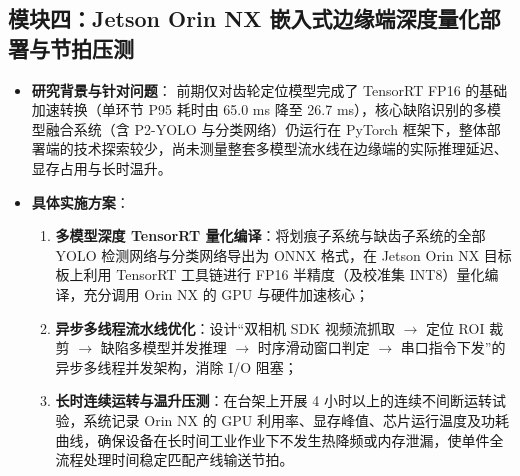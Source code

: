 \subsection*{模块四：Jetson Orin NX 嵌入式边缘端深度量化部署与节拍压测}
\begin{itemize}
    \item \textbf{研究背景与针对问题}：
    前期仅对齿轮定位模型完成了 TensorRT FP16 的基础加速转换（单环节 P95 耗时由 65.0 ms 降至 26.7 ms），核心缺陷识别的多模型融合系统（含 P2-YOLO 与分类网络）仍运行在 PyTorch 框架下，整体部署端的技术探索较少，尚未测量整套多模型流水线在边缘端的实际推理延迟、显存占用与长时温升。
    \item \textbf{具体实施方案}：
    \begin{enumerate}
        \item \textbf{多模型深度 TensorRT 量化编译}：将划痕子系统与缺齿子系统的全部 YOLO 检测网络与分类网络导出为 ONNX 格式，在 Jetson Orin NX 目标板上利用 TensorRT 工具链进行 FP16 半精度（及校准集 INT8）量化编译，充分调用 Orin NX 的 GPU 与硬件加速核心；
        \item \textbf{异步多线程流水线优化}：设计“双相机 SDK 视频流抓取 $\rightarrow$ 定位 ROI 裁剪 $\rightarrow$ 缺陷多模型并发推理 $\rightarrow$ 时序滑动窗口判定 $\rightarrow$ 串口指令下发”的异步多线程并发架构，消除 I/O 阻塞；
        \item \textbf{长时连续运转与温升压测}：在台架上开展 4 小时以上的连续不间断运转试验，系统记录 Orin NX 的 GPU 利用率、显存峰值、芯片运行温度及功耗曲线，确保设备在长时间工业作业下不发生热降频或内存泄漏，使单件全流程处理时间稳定匹配产线输送节拍。
    \end{enumerate}
\end{itemize}

